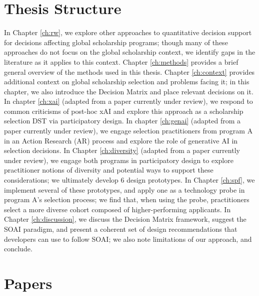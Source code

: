 \section{Thesis Structure}
In Chapter \ref{ch:rw}, we explore other approaches to quantitative decision support for decisions affecting global scholarship programs; though many of these approaches do not focus on the global scholarship context, we identify gaps in the literature as it applies to this context. Chapter \ref{ch:methods} provides a brief general overview of the methods used in this thesis. Chapter \ref{ch:context} provides additional context on global scholarship selection and problems facing it; in this chapter, we also introduce the Decision Matrix and place relevant decisions on it. In chapter \ref{ch:xai} (adapted from a paper currently under review), we respond to common criticisms of post-hoc xAI and explore this approach as a scholarship selection DST via participatory design. In chapter \ref{ch:genai} (adapted from a paper currently under review), we engage selection practitioners from program A in an Action Research (AR) process and explore the role of generative AI in selection decisions. In Chapter \ref{ch:diversity} (adapted from a paper currently under review), we engage both programs in participatory design to explore practitioner notions of diversity and potential ways to support these considerations; we ultimately develop 6 design prototypes. In Chapter \ref{ch:spf}, we implement several of these prototypes, and apply one as a technology probe in program A's selection process; we find that, when using the probe, practitioners select a more diverse cohort composed of higher-performing applicants. In Chapter \ref{ch:discussion}, we discuss the Decision Matrix framework, suggest the SOAI paradigm, and present a coherent set of design recommendations that developers can use to follow SOAI; we also note limitations of our approach, and conclude.

\section{Papers}
